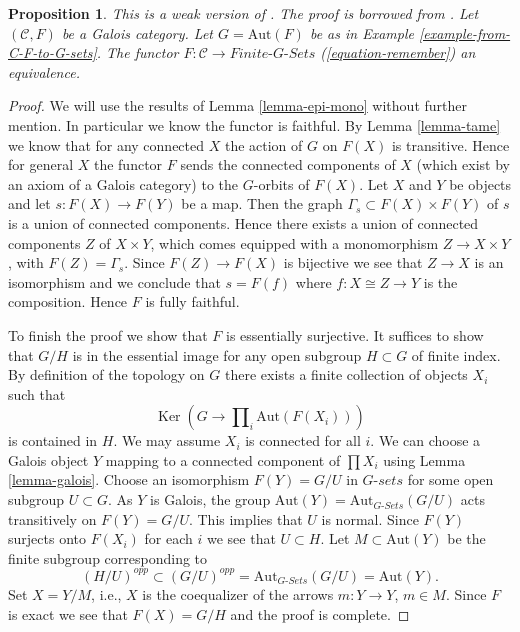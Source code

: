 \documentclass{stacks-project}
\newenvironment{reference}{\comment}{\endcomment}
\theoremstyle{plain}
\newtheorem{proposition}[subsection]{Proposition}
\theoremstyle{definition}
\theoremstyle{remark}
\numberwithin{equation}{subsection}
\def\Ker{\mathop{\mathrm{Ker}}}
\begin{document}
\begin{proposition}
\label{proposition-galois}
\begin{reference}
This is a weak version of \cite[Expos\'e V]{SGA1}.
The proof is borrowed from \cite[Theorem 7.2.5]{BS}.
\end{reference}
Let $(\mathcal{C}, F)$ be a Galois category. Let $G = \text{Aut}(F)$
be as in Example \ref{example-from-C-F-to-G-sets}. The functor
$F : \mathcal{C} \to \textit{Finite-}G\textit{-Sets}$
(\ref{equation-remember}) an equivalence.
\end{proposition}

\begin{proof}
We will use the results of Lemma \ref{lemma-epi-mono} without further mention.
In particular we know the functor is faithful.
By Lemma \ref{lemma-tame} we know that for any connected $X$ the
action of $G$ on $F(X)$ is transitive. Hence for general $X$ the functor
$F$ sends the connected components of $X$ (which exist by
an axiom of a Galois category) to the $G$-orbits of $F(X)$.
Let $X$ and $Y$ be objects and let
$s : F(X) \to F(Y)$ be a map. Then the graph
$\Gamma_s \subset F(X) \times F(Y)$ of $s$
is a union of connected components. Hence there exists a
union of connected components $Z$ of $X \times Y$,
which comes equipped with a monomorphism $Z \to X \times Y$,
with $F(Z) = \Gamma_s$. Since $F(Z) \to F(X)$ is bijective
we see that $Z \to X$ is an isomorphism and we conclude
that $s = F(f)$ where $f : X \cong Z \to Y$ is the composition.
Hence $F$ is fully faithful.

\medskip\noindent
To finish the proof we show that $F$ is essentially surjective.
It suffices to show that $G/H$ is in the essential image for
any open subgroup $H \subset G$ of finite index.
By definition of the topology on $G$ there exists a finite
collection of objects $X_i$ such that
$$
\Ker(G \longrightarrow \prod\nolimits_i \text{Aut}(F(X_i)))
$$
is contained in $H$. We may assume $X_i$ is connected
for all $i$. We can choose a Galois object $Y$ mapping
to a connected component of $\prod X_i$ using
Lemma \ref{lemma-galois}. Choose an isomorphism $F(Y) = G/U$
in $G\textit{-sets}$ for some open subgroup $U \subset G$.
As $Y$ is Galois, the group
$\text{Aut}(Y) = \text{Aut}_{G\textit{-Sets}}(G/U)$ acts transitively
on $F(Y) = G/U$. This implies that $U$ is normal. Since
$F(Y)$ surjects onto $F(X_i)$ for each $i$ we see that
$U \subset H$. Let $M \subset \text{Aut}(Y)$ be the finite subgroup
corresponding to
$$
(H/U)^{opp} \subset (G/U)^{opp} = \text{Aut}_{G\textit{-Sets}}(G/U)
= \text{Aut}(Y).
$$
Set $X = Y/M$, i.e., $X$ is the coequalizer
of the arrows $m : Y \to Y$, $m \in M$.
Since $F$ is exact we see that $F(X) = G/H$ and the
proof is complete.
\end{proof}
\end{document}
